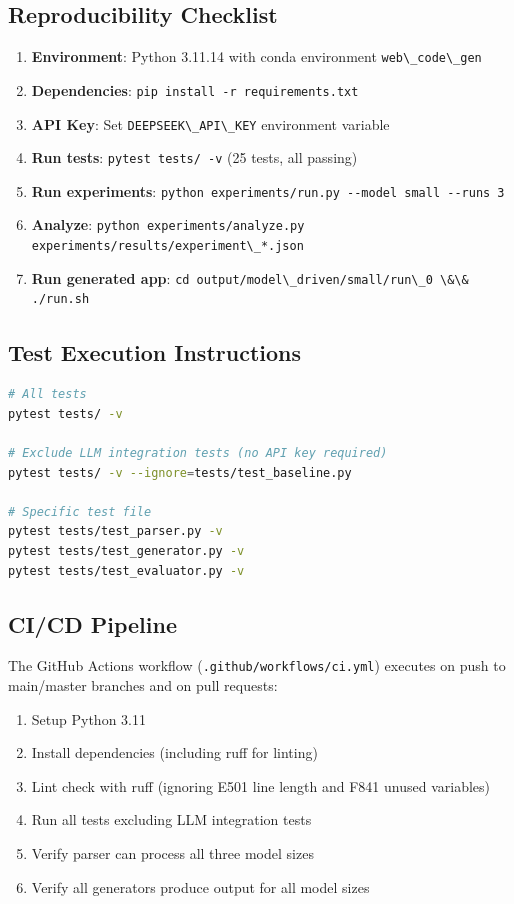 \documentclass[11pt,a4paper]{article}
\begin{document}
{\subsection{Reproducibility Checklist}

\begin{enumerate}[leftmargin=*]
    \item \textbf{Environment}: Python 3.11.14 with conda environment {\lstinline|web\_code\_gen|}
    \item \textbf{Dependencies}: {\lstinline|pip install -r requirements.txt|}
    \item \textbf{API Key}: Set {\lstinline|DEEPSEEK\_API\_KEY|} environment variable
    \item \textbf{Run tests}: {\lstinline|pytest tests/ -v|} (25 tests, all passing)
    \item \textbf{Run experiments}: {\lstinline|python experiments/run.py --model small --runs 3|}
    \item \textbf{Analyze}: {\lstinline|python experiments/analyze.py experiments/results/experiment\_*.json|}
    \item \textbf{Run generated app}: {\lstinline|cd output/model\_driven/small/run\_0 \&\& ./run.sh|}
\end{enumerate}

\subsection{Test Execution Instructions}

\begin{lstlisting}[language=bash, caption={Running the test suite}]
# All tests
pytest tests/ -v

# Exclude LLM integration tests (no API key required)
pytest tests/ -v --ignore=tests/test_baseline.py

# Specific test file
pytest tests/test_parser.py -v
pytest tests/test_generator.py -v
pytest tests/test_evaluator.py -v
\end{lstlisting}

\subsection{CI/CD Pipeline}

The GitHub Actions workflow ({\lstinline|.github/workflows/ci.yml|}) executes on push to main/master branches and on pull requests:

\begin{enumerate}[leftmargin=*]
    \item Setup Python 3.11
    \item Install dependencies (including ruff for linting)
    \item Lint check with ruff (ignoring E501 line length and F841 unused variables)
    \item Run all tests excluding LLM integration tests
    \item Verify parser can process all three model sizes
    \item Verify all generators produce output for all model sizes
\end{enumerate}

}
\end{document}
